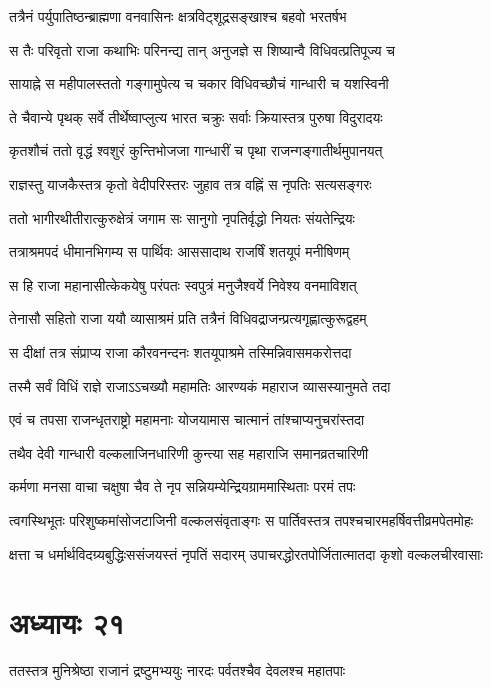 \twolineshloka
{तत्रैनं पर्युपातिष्ठन्ब्राह्मणा वनवासिनः}
{क्षत्रविट्शूद्रसङ्खाश्च बहवो भरतर्षभ}


\twolineshloka
{स तैः परिवृतो राजा कथाभिः परिनन्द्य तान्}
{अनुजज्ञे स शिष्यान्वै विधिवत्प्रतिपूज्य च}


\twolineshloka
{सायाह्ने स महीपालस्ततो गङ्गामुपेत्य च}
{चकार विधिवच्छौचं गान्धारी च यशस्विनी}


\twolineshloka
{ते चैवान्ये पृथक् सर्वे तीर्थेष्वाप्लुत्य भारत}
{चक्रुः सर्वाः क्रियास्तत्र पुरुषा विदुरादयः}


\twolineshloka
{कृतशौचं ततो वृद्धं श्वशुरं कुन्तिभोजजा}
{गान्धारीं च पृथा राजन्गङ्गातीर्थमुपानयत्}


\twolineshloka
{राज्ञस्तु याजकैस्तत्र कृतो वेदीपरिस्तरः}
{जुहाव तत्र वह्निं स नृपतिः सत्यसङ्गरः}


\twolineshloka
{ततो भागीरथीतीरात्कुरुक्षेत्रं जगाम सः}
{सानुगो नृपतिर्वृद्धो नियतः संयतेन्द्रियः}


\twolineshloka
{तत्राश्रमपदं धीमानभिगम्य स पार्थिवः}
{आससादाथ राजर्षिं शतयूपं मनीषिणम्}


\twolineshloka
{स हि राजा महानासीत्केकयेषु परंपतः}
{स्वपुत्रं मनुजैश्वर्ये निवेश्य वनमाविशत्}


\twolineshloka
{तेनासौ सहितो राजा ययौ व्यासाश्रमं प्रति}
{तत्रैनं विधिवद्राजन्प्रत्यगृह्णात्कुरूद्वहम्}


\twolineshloka
{स दीक्षां तत्र संप्राप्य राजा कौरवनन्दनः}
{शतयूपाश्रमे तस्मिन्निवासमकरोत्तदा}


\twolineshloka
{तस्मै सर्वं विधिं राज्ञे राजाऽऽचख्यौ महामतिः}
{आरण्यकं महाराज व्यासस्यानुमते तदा}


\twolineshloka
{एवं च तपसा राजन्धृतराष्ट्रो महामनाः}
{योजयामास चात्मानं तांश्चाप्यनुचरांस्तदा}


\twolineshloka
{तथैव देवी गान्धारी वल्कलाजिनधारिणी}
{कुन्त्या सह महाराजि समानव्रतचारिणी}


\twolineshloka
{कर्मणा मनसा वाचा चक्षुषा चैव ते नृप}
{सन्नियम्येन्द्रियग्राममास्थिताः परमं तपः}


\twolineshloka
{त्वगस्थिभूतः परिशुष्कमांसोजटाजिनी वल्कलसंवृताङ्गः}
{स पार्तिवस्तत्र तपश्चचारमहर्षिवत्तीव्रमपेतमोहः}


\twolineshloka
{क्षत्ता च धर्मार्थविदग्र्यबुद्धिःससंजयस्तं नृपतिं सदारम्}
{उपाचरद्धोरतपोर्जितात्मातदा कृशो वल्कलचीरवासाः}


\chapter{अध्यायः २१}
\twolineshloka
{ततस्तत्र मुनिश्रेष्ठा राजानं द्रष्टुमभ्ययुः}
{नारदः पर्वतश्चैव देवलश्च महातपाः}


